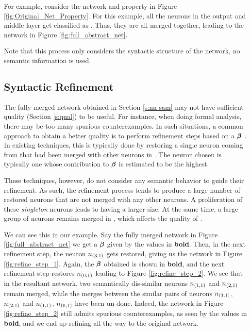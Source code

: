 


For example, consider the network and property in Figure
\ref{fig:Original_Net_Property}. For this example, all the neurons in the output
and middle layer get classified as \inc. Thus, they are all merged together,
leading to the network in Figure \ref{fig:full_abstract_net}.

Note that this process only considers the syntactic structure of the network, no
semantic information is used.

\subsection{ Syntactic Refinement }

The fully merged network obtained in Section \ref{s:nn-sam} may not have
sufficient quality (Section \ref{s:qual}) to be useful. For instance, when doing
formal analysis, there may be too many spurious counterexamples. In such
situations, a common approach to obtain a better quality \abs is to perform
refinement steps based on a \gencex $\boldsymbol{\beta}$ \cite{cegar-nn,
cegarette, cleverest-nn}. In
existing techniques, this is typically done by restoring a single neuron coming
from \cnc that had been merged with other neurons in \abs. The neuron chosen is
typically one whose contribution to $\boldsymbol{\beta}$ is estimated to be the
highest.

These techniques, however, do not consider any semantic behavior to guide their
refinement. As such, the refinement process tends to produce a large number of
restored neurons that are not merged with any other neurons. A proliferation of
these \emph{singleton} neurons leads to \abs having a larger size. At the same time, 
a large group of neurons remains merged in \abs, which affects the quality of \abs. 

We can see this in our example. Say the fully merged network in Figure
\ref{fig:full_abstract_net} we get a $\boldsymbol{\beta}$ given by the values in \textbf{bold}.
Then, in the next refinement step, the neuron $n_{(3,1)}$ gets restored, giving
us the network in Figure \ref{fig:refine_step_1}. Again, the $\boldsymbol{\beta}$
obtained is shown in \textbf{bold}, and the next refinement step restores $n_{(0,1)}$
leading to Figure \ref{fig:refine_step_2}. We see that in the resultant network,
two semantically dis-similar neurons $n_{(1,1)}$ and $n_{(2,1)}$ remain merged,
while the merges between the similar pairs of neurons $n_{(3,1)}$, $n_{(2,1)}$
and $n_{(1,1)}$, $n_{(0,1)}$ have been un-done. Indeed, the network in Figure
\ref{fig:refine_step_2} still admits spurious counterexamples, as seen by the
values in \textbf{bold}, and we end up refining all the way to the original
network.



